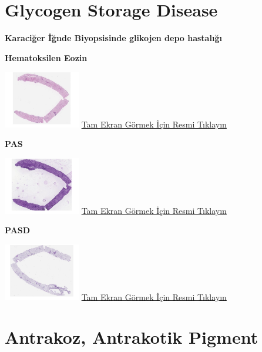 \documentclass[
  letterpaper,
  paper=6in:9in,
  pagesize=pdftex,
  headinclude=on,
  footinclude=on,
  12pt]{scrbook}
\begin{document}
\hypertarget{sec-glycogen-storage-disease}{%
\section{Glycogen Storage Disease}\label{sec-glycogen-storage-disease}}

\textbf{Karaciğer İğnde Biyopsisinde glikojen depo hastalığı}

\textbf{Hematoksilen Eozin}

\href{https://images.patolojiatlasi.com/glycogenstorage/HE.html}{\includegraphics[width=0.25\textwidth,height=\textheight]{./screenshots/glycogenstorage-HE_screenshot.png}}
\href{https://images.patolojiatlasi.com/glycogenstorage/HE.html}{Tam
Ekran Görmek İçin Resmi Tıklayın}

\textbf{PAS}

\href{https://images.patolojiatlasi.com/glycogenstorage/PAS.html}{\includegraphics[width=0.25\textwidth,height=\textheight]{./screenshots/glycogenstorage-PAS_screenshot.png}}
\href{https://images.patolojiatlasi.com/glycogenstorage/PAS.html}{Tam
Ekran Görmek İçin Resmi Tıklayın}

\textbf{PASD}

\href{https://images.patolojiatlasi.com/glycogenstorage/PASD.html}{\includegraphics[width=0.25\textwidth,height=\textheight]{./screenshots/glycogenstorage-PASD_screenshot.png}}
\href{https://images.patolojiatlasi.com/glycogenstorage/PASD.html}{Tam
Ekran Görmek İçin Resmi Tıklayın}

\hypertarget{sec-antrakoz-antrakotik-pigment}{%
\section{Antrakoz, Antrakotik
Pigment}\label{sec-antrakoz-antrakotik-pigment}}
\end{document}
